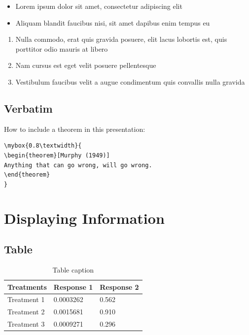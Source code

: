 \documentclass[
paper=128mm:96mm, %
fontsize=11pt, %
pagesize, %
parskip=half-, %
]{scrartcl} %
\theoremstyle{mythmstyle} %
\newtheorem{theorem}{Definici\'on}[section] %
\newcommand*{\mybox}[2]{ %
\par\noindent
\begin{tikzpicture}[mynodestyle/.style={rectangle,draw=mygreen,thick,inner sep=2mm,text justified,top color=white,bottom color=white,above}]\node[mynodestyle,at={(0.5*#1+2mm+0.4pt,0)}]{ %
\begin{minipage}[t]{#1}
#2
\end{minipage}
};
\end{tikzpicture}
\par\vspace{-1.3em}}
\begin{document}
\begin{itemize}
\item Lorem ipsum dolor sit amet, consectetur adipiscing elit
\item Aliquam blandit faucibus nisi, sit amet dapibus enim tempus eu
\end{itemize}

\begin{enumerate}
\item Nulla commodo, erat quis gravida posuere, elit lacus lobortis est, quis porttitor odio mauris at libero
\item Nam cursus est eget velit posuere pellentesque
\item Vestibulum faucibus velit a augue condimentum quis convallis nulla gravida
\end{enumerate}

\clearpage


\subsection{Verbatim}

How to include a theorem in this presentation:
\begin{verbatim}
\mybox{0.8\textwidth}{
\begin{theorem}[Murphy (1949)]
Anything that can go wrong, will go wrong.
\end{theorem}
}
\end{verbatim}

\clearpage



\section{Displaying Information}

\clearpage


\subsection{Table}

\begin{table}[h]
\centering
\begin{tabular}{l l l}
\toprule
\textbf{Treatments} & \textbf{Response 1} & \textbf{Response 2}\\
\midrule
Treatment 1 & 0.0003262 & 0.562 \\
Treatment 2 & 0.0015681 & 0.910 \\
Treatment 3 & 0.0009271 & 0.296 \\
\bottomrule
\end{tabular}
\caption{Table caption}
\end{table}
\end{document}
